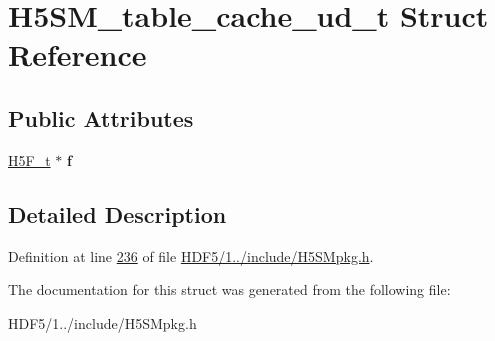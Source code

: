 \hypertarget{struct_h5_s_m__table__cache__ud__t}{}\section{H5\+S\+M\+\_\+table\+\_\+cache\+\_\+ud\+\_\+t Struct Reference}
\label{struct_h5_s_m__table__cache__ud__t}
\subsection*{Public Attributes}
\begin{DoxyCompactItemize}
\item 
\mbox{\label{struct_h5_s_m__table__cache__ud__t_a46802ec0bb58b72adecd527b17ac4d07}} 
\hyperlink{struct_h5_f__t}{H5\+F\+\_\+t} $\ast$ {\bfseries f}
\end{DoxyCompactItemize}


\subsection{Detailed Description}


Definition at line \hyperlink{_h_d_f5_21_810_81_2include_2_h5_s_mpkg_8h_source_l00236}{236} of file \hyperlink{_h_d_f5_21_810_81_2include_2_h5_s_mpkg_8h_source}{H\+D\+F5/1../include/\+H5\+S\+Mpkg.\+h}.



The documentation for this struct was generated from the following file\+:\begin{DoxyCompactItemize}
\item 
H\+D\+F5/1../include/\+H5\+S\+Mpkg.\+h\end{DoxyCompactItemize}
